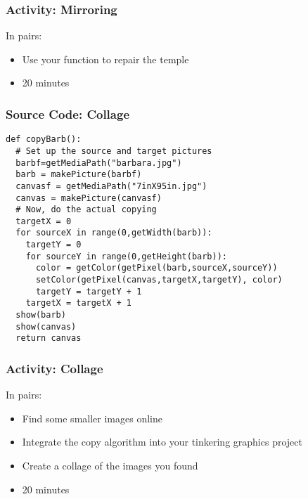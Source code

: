 
\begin{frame}
	\frametitle{Activity: Mirroring}
	
	In pairs:
	
	\vspace{2em}
	
	\begin{itemize}		
		\item Use your function to repair the temple
		\item 20 minutes
	\end{itemize}
\end{frame}

\begin{frame}[fragile]
	\frametitle{Source Code: Collage}
	
\begin{lstlisting}
def copyBarb():
  # Set up the source and target pictures
  barbf=getMediaPath("barbara.jpg")
  barb = makePicture(barbf)
  canvasf = getMediaPath("7inX95in.jpg")
  canvas = makePicture(canvasf)
  # Now, do the actual copying
  targetX = 0
  for sourceX in range(0,getWidth(barb)):
    targetY = 0
    for sourceY in range(0,getHeight(barb)):
      color = getColor(getPixel(barb,sourceX,sourceY))
      setColor(getPixel(canvas,targetX,targetY), color)
      targetY = targetY + 1
    targetX = targetX + 1
  show(barb)
  show(canvas)
  return canvas
\end{lstlisting}

\end{frame}


\begin{frame}
	\frametitle{Activity: Collage}
	
	In pairs:
	
	\vspace{2em}
	
	\begin{itemize}		
		\item Find some smaller images online
		\item Integrate the copy algorithm into your tinkering graphics project
		\item Create a collage of the images you found
		\item 20 minutes
	\end{itemize}
\end{frame}

